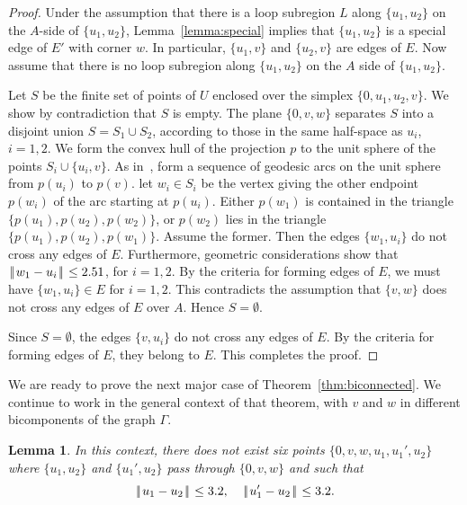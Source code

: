 \documentclass[11pt]{amsart}
\def\|{{\hskip0.1em|\hskip-0.15em|\hskip0.1em}}
\newtheorem{lemma}{Lemma}
\begin{document}
\begin{proof} Under the assumption that 
there is a loop subregion $L$ along 
$\{u_1,u_2\}$ on the $A$-side
of $\{u_1,u_2\}$, Lemma~\ref{lemma:special} implies that
$\{u_1,u_2\}$ is a special edge of $E'$ with
corner $w$.  In particular, $\{u_1,v\}$ and $\{u_2,v\}$ are
edges of $E$.  Now assume that there is no loop subregion along
$\{u_1,u_2\}$ on the $A$ side of $\{u_1,u_2\}$.

Let $S$ be the finite set of points of $U$ enclosed
over the simplex $\{0,u_1,u_2,v\}$.  We show by contradiction
that $S$ is empty.
The plane $\{0,v,w\}$ separates
$S$ into a disjoint union $S = S_1\cup S_2$, according to those
in the same half-space as $u_i$, $i=1,2$.
We form the convex hull of the projection $p$ to the unit sphere of the 
points $S_i\cup\{u_i,v\}$.  As in~\cite[Sec.~12.13]{Hales:2006:DCG},
form a sequence of geodesic arcs on the unit sphere from $p(u_i)$
to $p(v)$.  let $w_i\in S_i$ be the vertex giving the other endpoint $p(w_i)$
of the arc starting at $p(u_i)$.  Either $p(w_1)$ is contained in the
triangle $\{p(u_1),p(u_2),p(w_2)\}$, or
$p(w_2)$ lies in the triangle $\{p(u_1),p(u_2),p(w_1)\}$.  Assume
the former.  Then the edges $\{w_1,u_i\}$ do not cross any edges
of $E$.  Furthermore, geometric considerations show that
$\|w_1-u_i\|\le 2.51$, for $i=1,2$.  By the criteria for forming
edges of $E$, we must have $\{w_1,u_i\}\in E$ for $i=1,2$.  This
contradicts the assumption that $\{v,w\}$ does not cross any edges
of $E$ over $A$.  Hence $S=\emptyset$.

Since $S=\emptyset$, the edges $\{v,u_i\}$ do not cross any edges
of $E$.  By the criteria for forming edges of $E$, they belong to $E$.
This completes the proof.
\end{proof}

We are ready to prove the next major case of Theorem~\ref{thm:biconnected}.
We continue to work in the general context of that theorem, with $v$ and $w$
in different bicomponents of the graph $\Gamma$.

\begin{lemma}  In this context, there does not exist six points $\{0,v,w,u_1,u_1',u_2\}$
where $\{u_1,u_2\}$ and $\{u_1',u_2\}$ pass through $\{0,v,w\}$ and such that
  $$\|u_1-u_2\|\le 3.2,\quad \|u_1'-u_2\|\le 3.2.$$
\end{lemma}
\end{document}
